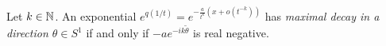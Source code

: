 \begin{comment}
  \begin{defn}
    \marginnote{\cite[130]{hotta2008}, \cite[79]{Loday2014}}
    A function is \emph{of maximal decay}, if \PROBLEM{}
    \begin{s-rem}
      \marginnote{\cite[79]{Loday2014}}
      An exponential $e^{q(1/t)}=e^{-\frac{a}{t^{k}}(x+o(t^{-k}))}$ has maximal
      decay in a direction $\tilde\theta\in S^1$ if and only if
      $-ae^{-ik\tilde\theta}$ is real negative.
    \end{s-rem}

    \comm{On the other hand, is a function is \emph{flat}, if\dots}
  \end{defn}
\end{comment}
\begin{defn}
  Let $k\in\mathbb{N}$.
  An exponential $e^{q(1/t)}=e^{-\frac{a}{t^{k}}(x+o(t^{-k}))}$ has
  \emph{maximal decay in a direction $\theta\in S^1$} if and only if
  $-ae^{-ik\tilde\theta}$ is real negative.
\end{defn}

